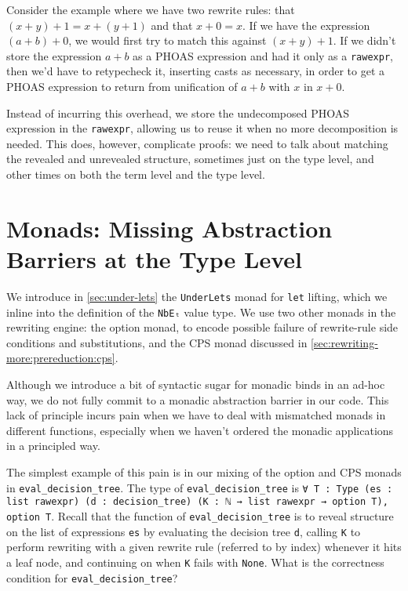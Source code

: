 Consider the example where we have two rewrite rules: that $(x + y) + 1 = x + (y + 1)$ and that $x + 0 = x$.
If we have the expression $(a + b) + 0$, we would first try to match this against $(x + y) + 1$.
If we didn't store the expression $a + b$ as a PHOAS expression and had it only as a \texttt{rawexpr}, then we'd have to retypecheck it, inserting casts as necessary, in order to get a PHOAS expression to return from unification of $a + b$ with $x$ in $x + 0$.

Instead of incurring this overhead, we store the undecomposed PHOAS expression in the \texttt{rawexpr}, allowing us to reuse it when no more decomposition is needed.
This does, however, complicate proofs: we need to talk about matching the revealed and unrevealed structure, sometimes just on the type level, and other times on both the term level and the type level.

\section{Monads: Missing Abstraction Barriers at the Type Level}\label{sec:rewriting-more:monads}
We introduce in \autoref{sec:under-lets} the \texttt{UnderLets} monad for \texttt{let} lifting, which we inline into the definition of the \texttt{NbEₜ} value type.
We use two other monads in the rewriting engine: the option monad, to encode possible failure of rewrite-rule side conditions and substitutions, and the CPS monad discussed in \autoref{sec:rewriting-more:prereduction:cps}.

Although we introduce a bit of syntactic sugar for monadic binds in an ad-hoc way, we do not fully commit to a monadic abstraction barrier in our code.
This lack of principle incurs pain when we have to deal with mismatched monads in different functions, especially when we haven't ordered the monadic applications in a principled way.

The simplest example of this pain is in our mixing of the option and CPS monads in \texttt{eval_decision_tree}.
The type of \texttt{eval_decision_tree} is \texttt{∀ {T : Type} (es : list rawexpr) (d : decision_tree) (K : ℕ → list rawexpr → option T), option T}.
Recall that the function of \texttt{eval_decision_tree} is to reveal structure on the list of expressions \texttt{es} by evaluating the decision tree \texttt{d}, calling \texttt{K} to perform rewriting with a given rewrite rule (referred to by index) whenever it hits a leaf node, and continuing on when \texttt{K} fails with \texttt{None}.
What is the correctness condition for \texttt{eval_decision_tree}?

